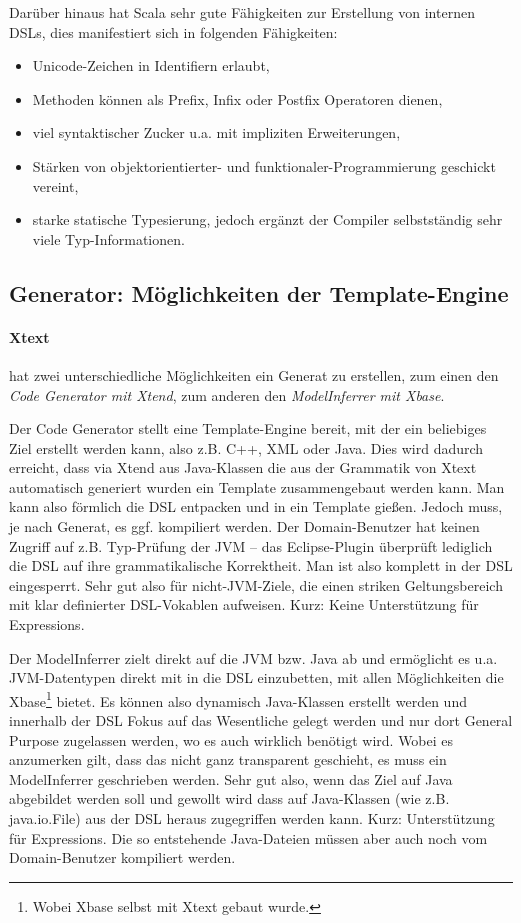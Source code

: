 Darüber hinaus hat Scala sehr gute Fähigkeiten zur Erstellung von internen
DSLs, dies manifestiert sich in folgenden Fähigkeiten:

\begin{itemize}
  \item Unicode-Zeichen in Identifiern erlaubt,
  \item Methoden können als Prefix, Infix oder Postfix Operatoren dienen,
  \item viel syntaktischer Zucker u.a. mit impliziten Erweiterungen,
  \item Stärken von objektorientierter- und funktionaler-Programmierung
        geschickt vereint,
  \item starke statische Typesierung, jedoch ergänzt der Compiler selbstständig
        sehr viele Typ-Informationen.
\end{itemize}


\subsection{Generator: Möglichkeiten der Template-Engine}\label{sec-generator}

\paragraph{Xtext} hat zwei unterschiedliche Möglichkeiten ein
Generat zu erstellen, zum einen den \emph{Code Generator mit Xtend},
zum anderen den \emph{ModelInferrer mit Xbase}.

Der Code Generator stellt eine Template-Engine bereit, mit der
ein beliebiges Ziel erstellt werden kann, also z.B. C++, XML oder Java.
Dies wird dadurch erreicht, dass via Xtend aus Java-Klassen die aus der
Grammatik von Xtext automatisch generiert wurden ein Template zusammengebaut
werden kann. Man kann also förmlich die DSL entpacken und in ein Template
gießen.
Jedoch muss, je nach Generat, es ggf. kompiliert werden. Der
Domain-Benutzer hat keinen Zugriff auf z.B. Typ-Prüfung der JVM --
das Eclipse-Plugin überprüft lediglich die DSL auf ihre
grammatikalische Korrektheit. Man ist also komplett in der DSL eingesperrt.
Sehr gut also für nicht-JVM-Ziele, die einen striken Geltungsbereich mit
klar definierter DSL-Vokablen aufweisen. Kurz: Keine Unterstützung für
Expressions.

Der ModelInferrer zielt direkt auf die JVM bzw. Java ab und ermöglicht es
u.a. JVM-Datentypen direkt mit in die DSL einzubetten, mit allen Möglichkeiten
die Xbase\footnote{Wobei Xbase selbst mit Xtext gebaut wurde.}
bietet. Es können also dynamisch Java-Klassen erstellt werden und innerhalb
der DSL Fokus auf das Wesentliche gelegt werden und nur dort General Purpose
zugelassen werden, wo es auch wirklich benötigt wird.
Wobei es anzumerken gilt, dass das nicht ganz transparent geschieht,
es muss ein ModelInferrer geschrieben werden.
Sehr gut also, wenn das Ziel auf Java abgebildet werden soll und gewollt wird
dass auf Java-Klassen (wie z.B. java.io.File) aus der DSL heraus
zugegriffen werden kann. Kurz: Unterstützung für Expressions.
Die so entstehende Java-Dateien müssen aber auch noch vom Domain-Benutzer
kompiliert werden.\cite{xtext}

